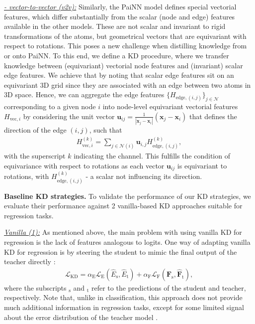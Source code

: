 \documentclass{article}
\newcommand{\loss}{\mathcal{L}}
\begin{document}
\underline{\emph{- vector-to-vector (v2v):}} Similarly, the PaiNN model defines special vectorial features, which differ substantially from the scalar (node and edge) features available in the other models. These are not scalar and invariant to rigid transformations of the atoms, but geometrical vectors that are equivariant with respect to rotations. This poses a new challenge when distilling knowledge from or onto PaiNN. To this end, we define a KD procedure, where we transfer knowledge between (equivariant) vectorial node features and (invariant) scalar edge features. We achieve that by noting that scalar edge features sit on an equivariant 3D grid since they are associated with an edge between two atoms in 3D space. Hence, we can aggregate the edge features $\{H_{\text{edge}, (i,j)}\}_{j\in \mathcal{N}}$ corresponding to a given node $i$ into node-level equivariant vectorial features $H_{\text{vec}, i}$ by considering the unit vector $\boldsymbol{u}_{ij} = \frac{1}{|\boldsymbol{x}_j - \boldsymbol{x}_i|}(\boldsymbol{x}_j - \boldsymbol{x}_i)$ that defines the direction of the edge $(i,j)$, such that
\begin{align}
    H_{\text{vec}, i}^{(k)} = \sum_{j\in\mathcal{N}(i)} \boldsymbol{u}_{i,j} H_{\text{edge}, (i,j)}^{(k)},
\end{align}
with the superscript $k$ indicating the channel. This fulfills the condition of equivariance with respect to rotations as each vector $\boldsymbol{u}_{ij}$ is equivariant to rotations, with $H_{\text{edge}, (i,j)}^{(k)}$ - a scalar not influencing its direction.

\textbf{Baseline KD strategies.}
To validate the performance of our KD strategies, we evaluate their performance against 2 vanilla-based KD approaches suitable for regression tasks.

\underline{\emph{Vanilla (1):}} As mentioned above, the main problem with using vanilla KD for regression is the lack of features analogous to logits. One way of adapting vanilla KD for regression is by steering the student to mimic the final output of the teacher directly \cite{xu2022contrastive}:
\begin{align}
    \loss_{\text{KD}} = \alpha_\text{E} \loss_\text{E}(\hat{E}_\text{s}, \hat{E}_\text{t}) +  \alpha_\text{F} \loss_\text{F}(\hat{\boldsymbol{F}}_\text{s}, \hat{\boldsymbol{F}}_\text{t}),
\end{align}
where the subscripts $_\text{s}$ and $_\text{t}$ refer to the predictions of the student and teacher, respectively. Note that, unlike in classification, this approach does not provide much additional information in regression tasks, except for some limited signal about the error distribution of the teacher model \cite{cheng2018model, saputra2019distilling}.
\end{document}

